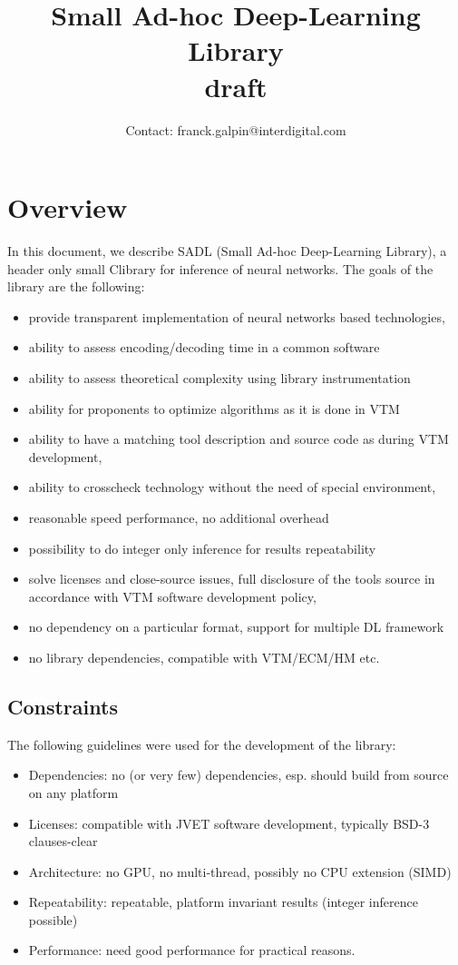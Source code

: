 \documentclass[10pt,a4paper]{article}
\title{Small Ad-hoc Deep-Learning Library\\{ \normalsize draft}}
\date{}
\author{Contact: franck.galpin@interdigital.com}
\newcommand{\CC}{C\nolinebreak\hspace{-.05em}\raisebox{.4ex}{\tiny\bf +}\nolinebreak\hspace{-.10em}\raisebox{.4ex}{\tiny\bf +}}
\def\CC{{C\nolinebreak[4]\hspace{-.05em}\raisebox{.4ex}{\tiny\bf ++}}}
\begin{document}
\maketitle
\section{Overview}
In this document, we describe SADL (Small Ad-hoc Deep-Learning Library), a header only small \CC library for inference of neural networks. The goals of the library are the following:
\begin{itemize}
\item provide transparent implementation of neural networks based technologies, 
\item ability to assess encoding/decoding time in a common software
\item ability to assess theoretical complexity using library instrumentation
\item ability for proponents to optimize algorithms as it is done in VTM
\item ability to have a matching tool description and source code as during VTM development,
\item ability to crosscheck technology without the need of special environment,
\item reasonable speed performance, no additional overhead
\item possibility to do integer only inference for results repeatability
\item solve licenses and close-source issues, full disclosure of the tools source in accordance with VTM software development policy,
\item no dependency on a particular format, support for multiple DL framework
\item no library dependencies, compatible with VTM/ECM/HM etc.
\end{itemize}
    
\subsection{Constraints}
The following guidelines were used for the development of the library:
\begin{itemize}
\item Dependencies: no (or very few) dependencies, esp. should build from source on any platform
\item Licenses: compatible with JVET software development, typically BSD-3 clauses-clear
\item Architecture: no GPU, no multi-thread, possibly no CPU extension (SIMD)
\item Repeatability: repeatable, platform invariant results (integer inference possible)
\item  Performance: need good performance for practical reasons.
\end{itemize}
\end{document}
